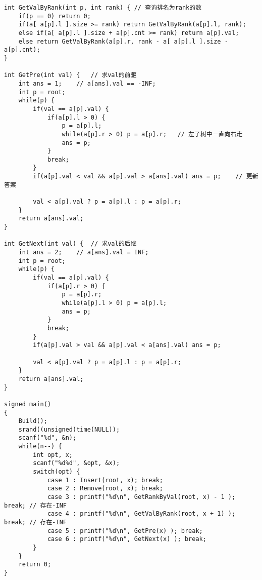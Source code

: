 \begin{lstlisting}
int GetValByRank(int p, int rank) {	// 查询排名为rank的数 
	if(p == 0) return 0;
	if(a[ a[p].l ].size >= rank) return GetValByRank(a[p].l, rank);
	else if(a[ a[p].l ].size + a[p].cnt >= rank) return a[p].val;
	else return GetValByRank(a[p].r, rank - a[ a[p].l ].size - a[p].cnt);
}

int GetPre(int val) {	// 求val的前驱 
	int ans = 1;	// a[ans].val == -INF;
	int p = root;
	while(p) {
		if(val == a[p].val) {
			if(a[p].l > 0) {
				p = a[p].l;
				while(a[p].r > 0) p = a[p].r;	// 左子树中一直向右走
				ans = p; 
			}
			break;
		}
		if(a[p].val < val && a[p].val > a[ans].val) ans = p;	// 更新答案 
		
		val < a[p].val ? p = a[p].l : p = a[p].r;
	}
	return a[ans].val;
}

int GetNext(int val) {	// 求val的后继 
	int ans = 2;	// a[ans].val = INF;
	int p = root;
	while(p) {
		if(val == a[p].val) {
			if(a[p].r > 0) {
				p = a[p].r;
				while(a[p].l > 0) p = a[p].l;
				ans = p;
			}
			break;
		}
		if(a[p].val > val && a[p].val < a[ans].val) ans = p;
		
		val < a[p].val ? p = a[p].l : p = a[p].r;
	}
	return a[ans].val;
}

signed main()
{
	Build();
	srand((unsigned)time(NULL));
	scanf("%d", &n);
	while(n--) {
		int opt, x;
		scanf("%d%d", &opt, &x);
		switch(opt) {
			case 1 : Insert(root, x); break;
			case 2 : Remove(root, x); break;
			case 3 : printf("%d\n", GetRankByVal(root, x) - 1 ); break;	// 存在-INF 
			case 4 : printf("%d\n", GetValByRank(root, x + 1) ); break;	// 存在-INF 
			case 5 : printf("%d\n", GetPre(x) ); break;
			case 6 : printf("%d\n", GetNext(x) ); break;
		}
	}
	return 0;
}
\end{lstlisting}

